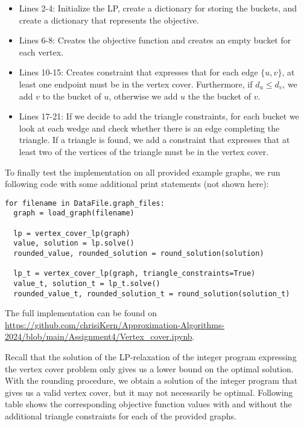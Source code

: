 \documentclass{article}
\begin{document}
\begin{itemize}
    \item Lines 2-4: Initialize the LP, create a dictionary for storing the buckets, and create a dictionary that represents the objective. 
    \item Lines 6-8: Creates the objective function and creates an empty bucket for each vertex.
    \item Lines 10-15: Creates constraint that expresses that for each edge $\{u,v\}$, at least one endpoint must be in the vertex cover. Furthermore, if $d_u \le d_v$, we add $v$ to the bucket of $u$, otherwise we add $u$ the the bucket of $v$.
    \item Lines 17-21: If we decide to add the triangle constraints, for each bucket we look at each wedge and check whether there is an edge completing the triangle. If a triangle is found, we add a constraint that expresses that at least two of the vertices of the triangle must be in the vertex cover. 
\end{itemize}

To finally test the implementation on all provided example graphs, we run following code with some additional print statements (not shown here):
\begin{lstlisting}
for filename in DataFile.graph_files:
  graph = load_graph(filename)
  
  lp = vertex_cover_lp(graph)
  value, solution = lp.solve()
  rounded_value, rounded_solution = round_solution(solution)
  
  lp_t = vertex_cover_lp(graph, triangle_constraints=True)
  value_t, solution_t = lp_t.solve()
  rounded_value_t, rounded_solution_t = round_solution(solution_t)
\end{lstlisting}

The full implementation can be found on \url{https://github.com/chrisiKern/Approximation-Algorithms-2024/blob/main/Assignment4/Vertex_cover.ipynb}.
\vspace{2.5em}

\noindent{}
\vspace{1em}


Recall that the solution of the LP-relaxation of the integer program expressing the vertex cover problem only gives us a lower bound on the optimal solution. With the rounding procedure, we obtain a solution of the integer program that gives us a valid vertex cover, but it may not necessarily be optimal. Following table shows the corresponding objective function values with and without the additional triangle constraints for each of the provided graphs.
\end{document}
